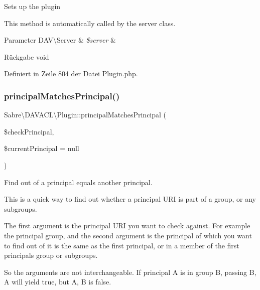 Sets up the plugin

This method is automatically called by the server class.


\begin{DoxyParams}[1]{Parameter}
D\+A\+V\textbackslash{}\+Server & {\em \$server} & \\
\hline
\end{DoxyParams}
\begin{DoxyReturn}{Rückgabe}
void 
\end{DoxyReturn}


Definiert in Zeile 804 der Datei Plugin.\+php.

\mbox{\label{class_sabre_1_1_d_a_v_a_c_l_1_1_plugin_a94d94881b17838ea3ae115c833804551}} 
\subsubsection{\texorpdfstring{principal\+Matches\+Principal()}{principalMatchesPrincipal()}}
{\footnotesize\ttfamily Sabre\textbackslash{}\+D\+A\+V\+A\+C\+L\textbackslash{}\+Plugin\+::principal\+Matches\+Principal (\begin{DoxyParamCaption}\item[{}]{\$check\+Principal,  }\item[{}]{\$current\+Principal = {\ttfamily null} }\end{DoxyParamCaption})}

Find out of a principal equals another principal.

This is a quick way to find out whether a principal U\+RI is part of a group, or any subgroups.

The first argument is the principal U\+RI you want to check against. For example the principal group, and the second argument is the principal of which you want to find out of it is the same as the first principal, or in a member of the first principal\textquotesingle{}s group or subgroups.

So the arguments are not interchangeable. If principal A is in group B, passing \textquotesingle{}B\textquotesingle{}, \textquotesingle{}A\textquotesingle{} will yield true, but \textquotesingle{}A\textquotesingle{}, \textquotesingle{}B\textquotesingle{} is false.

